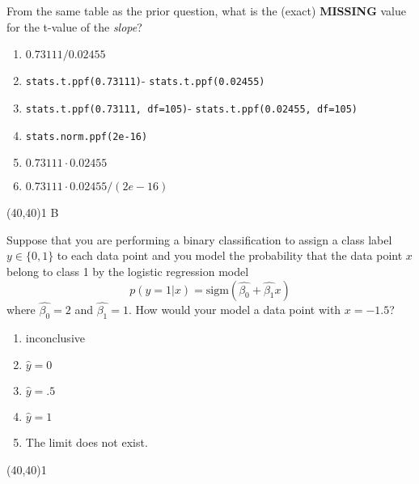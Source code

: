 \documentclass[addpoints]{exam}
\def\solutions{0}
\begin{document}
{\begin{questions}
\question[3] From the same table as the prior question, what is the (exact) \textbf{MISSING} value for the t-value of the \textit{slope}?

\vspace{2mm}

\begin{minipage}[b]{.85\textwidth}
	\begin{enumerate}[label=\Alph*.]
		\item $0.73111 / 0.02455$	
		\item \texttt{stats.t.ppf(0.73111)}- \texttt{stats.t.ppf(0.02455)}
		\item \texttt{stats.t.ppf(0.73111, df=105)}- \texttt{stats.t.ppf(0.02455, df=105)}
		\item \texttt{stats.norm.ppf(2e-16)}
		\item $0.73111 \cdot 0.02455$
		\item $0.73111 \cdot 0.02455/(2e-16)$
	\end{enumerate}
\end{minipage}
\begin{minipage}[b]{.1\textwidth}
	\vspace{\fill}\framebox(40,40){\if\solutions1 B \fi}
\end{minipage}

\question[3] Suppose that you are performing a binary classification to assign a class label $y \in \{0,1\}$ to each data point and you model the probability that the data point $x$ belong to class 1 by the logistic regression model
$$p(y=1|x)=\text{sigm}(\hat{\beta_0}+\hat{\beta_1}x)$$
where $\hat{\beta_0}=2$ and $\hat{\beta_1}=1$.  How would your model a data point with $x=-1.5$?

\vspace{2mm}

\begin{minipage}[b]{.85\textwidth}
	\begin{enumerate}[label=\Alph*.]
		\item inconclusive
		\item $\hat{y}=0$
		\item $\hat{y}=.5$
		\item $\hat{y}=1$
		\item The limit does not exist.
	\end{enumerate}
\end{minipage}
\begin{minipage}[b]{.1\textwidth}
	\vspace{\fill}\framebox(40,40){\if\solutions1 \fi}
\end{minipage}


\end{questions}}
\end{document}
